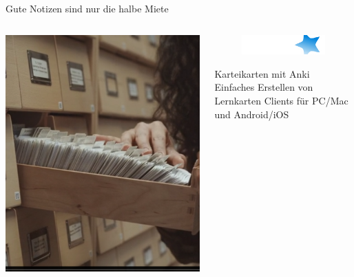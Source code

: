 \begin{frame}{Gute Notizen sind nur die halbe Miete}
    \begin{columns}
        \begin{column}{0.4\textwidth}
            \includegraphics[width=\textwidth]{graphics/Zettelkasten.png}
        \end{column}
        \begin{column}[t]{0.6\textwidth} 
            \vspace{-4cm}
            \begin{figure}[h]
                \includegraphics[width=\textwidth]{graphics/Logos/anki.png}
            \end{figure}  
            \begin{block}{Karteikarten mit Anki}
                Einfaches Erstellen von Lernkarten
                Clients für PC/Mac und Android/iOS
                
            \end{block}                     
        \end{column}        
    \end{columns}    
\end{frame}

